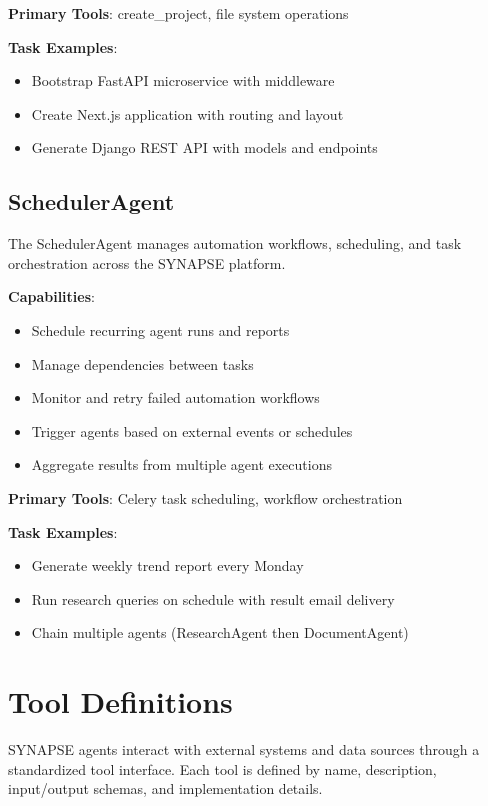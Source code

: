 \documentclass{report}
\begin{document}
\textbf{Primary Tools}: create\_project, file system operations

\textbf{Task Examples}:
\begin{itemize}
    \item Bootstrap FastAPI microservice with middleware
    \item Create Next.js application with routing and layout
    \item Generate Django REST API with models and endpoints
\end{itemize}

\section{SchedulerAgent}

The SchedulerAgent manages automation workflows, scheduling, and task orchestration across the SYNAPSE platform.

\textbf{Capabilities}:

\begin{itemize}
    \item Schedule recurring agent runs and reports
    \item Manage dependencies between tasks
    \item Monitor and retry failed automation workflows
    \item Trigger agents based on external events or schedules
    \item Aggregate results from multiple agent executions
\end{itemize}

\textbf{Primary Tools}: Celery task scheduling, workflow orchestration

\textbf{Task Examples}:
\begin{itemize}
    \item Generate weekly trend report every Monday
    \item Run research queries on schedule with result email delivery
    \item Chain multiple agents (ResearchAgent then DocumentAgent)
\end{itemize}

\chapter{Tool Definitions}

SYNAPSE agents interact with external systems and data sources through a standardized tool interface. Each tool is defined by name, description, input/output schemas, and implementation details.
\end{document}
